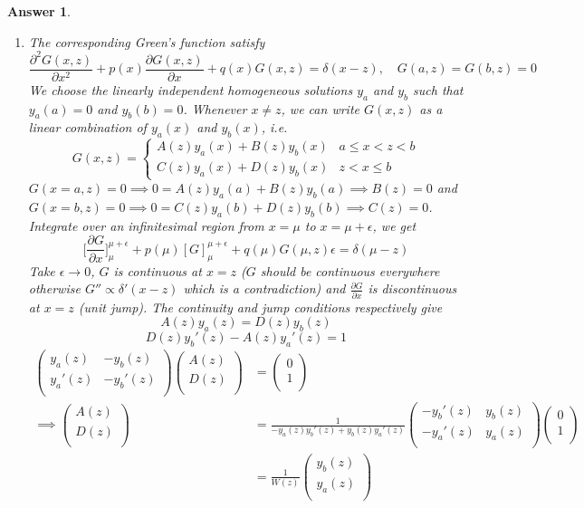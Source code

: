\documentclass[a4paper]{article}
\newtheorem{ans}{Answer}[section]
\theoremstyle{new}
\begin{document}
\begin{ans}\leavevmode
\begin{enumerate}[label=(\alph*)]
\item  The corresponding Green's function satisfy
$$\frac{\partial^2G(x,z)}{\partial x^2}+p(x)\frac{\partial G(x,z)}{\partial x}+q(x)G(x,z)=\delta(x-z),\quad G(a,z)=G(b,z)=0$$
We choose the linearly independent homogeneous solutions $y_a$ and $y_b$ such that $y_a(a)=0$ and $y_b(b)=0$. Whenever $x\neq z$, we can write $G(x,z)$ as a linear combination of $y_a(x)$ and $y_b(x)$, i.e.
$$G(x,z)=
\left\{
        \begin{array}{ll}
      A(z)y_a(x)+B(z)y_b(x) & a\leq x<z<b \\
      C(z)y_a(x)+D(z)y_b(x) & z<x\leq b
        \end{array}
    \right.$$
$G(x=a,z)=0\implies 0=A(z)y_a(a)+B(z)y_b(a)\implies B(z)=0$ and $G(x=b,z)=0\implies 0=C(z)y_a(b)+D(z)y_b(b)\implies C(z)=0$. Integrate over an infinitesimal region from $x=\mu$ to $x=\mu+\epsilon$, we get
$$\bigg[\frac{\partial G}{\partial x}\bigg]_\mu^{\mu+\epsilon}+p(\mu)[G]_{\mu}^{\mu+\epsilon}+q(\mu)G(\mu,z)\epsilon=\delta(\mu-z)$$
Take $\epsilon\rightarrow 0$, $G$ is continuous at $x=z$ ($G$ should be continuous everywhere otherwise $G''\propto\delta'(x-z)$ which is a contradiction) and $\frac{\partial G}{\partial x}$ is discontinuous at $x=z$ (unit jump). The continuity and jump conditions respectively give 
$$A(z)y_a(z)=D(z)y_b(z)$$ 
$$D(z)y_b'(z)-A(z)y_a'(z)=1$$
\begin{align}
\begin{pmatrix}y_a(z)&-y_b(z)\\y_a'(z)&-y_b'(z)\\\end{pmatrix}\begin{pmatrix}A(z)\\D(z)\\\end{pmatrix}&=\begin{pmatrix}0\\1\\\end{pmatrix}\nonumber\\\implies\begin{pmatrix}A(z)\\D(z)\\\end{pmatrix}&=\frac{1}{-y_a(z)y_b'(z)+y_b(z)y_a'(z)}\begin{pmatrix}-y_b'(z)&y_b(z)\\-y_a'(z)&y_a(z)\\\end{pmatrix}\begin{pmatrix}0\\1\\\end{pmatrix}\nonumber\\&=\frac{1}{W(z)}\begin{pmatrix}y_b(z)\\y_a(z)\\\end{pmatrix}\nonumber

\end{align}
\end{enumerate}
\end{ans}
\end{document}
